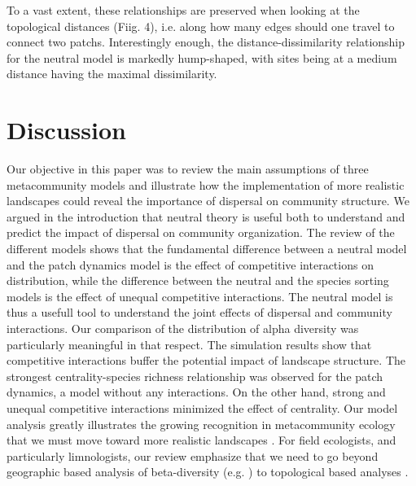 \documentclass[12pt]{article}
\begin{document}
To a vast extent, these relationships are preserved when looking at the
topological distances (Fiig. 4), i.e. along how many edges should one travel to
connect two patchs. Interestingly enough, the distance-dissimilarity
relationship for the neutral model is markedly hump-shaped, with sites being at
a medium distance having the maximal dissimilarity.

\section{Discussion}

Our objective in this paper was to review the main assumptions of three
metacommunity models and illustrate how the implementation of more realistic
landscapes could reveal the importance of dispersal on community structure. We
argued in the introduction that neutral theory is useful both to understand and
predict the impact of dispersal on community organization. The review of the
different models shows that the fundamental difference between a neutral model
and the patch dynamics model is the effect of competitive interactions on
distribution, while the difference between the neutral and the species sorting
models is the effect of unequal competitive interactions. The neutral model is
thus a usefull tool to understand the joint effects of dispersal and community
interactions. Our comparison of the distribution of alpha diversity was
particularly meaningful in that respect. The simulation results show that
competitive interactions buffer the potential impact of landscape structure. The
strongest centrality-species richness relationship was observed for the patch
dynamics, a model without any interactions. On the other hand, strong and
unequal competitive interactions minimized the effect of centrality. Our model
analysis greatly illustrates the growing recognition in metacommunity ecology
that we must move toward more realistic landscapes \parencite{Gilarranz2012}.
For field ecologists, and particularly limnologists, our review emphasize that
we need to go beyond geographic based analysis of beta-diversity (e.g.
\parencite{Legendre2005}) to topological based analyses \parencite{Peterson2013}.
\end{document}
